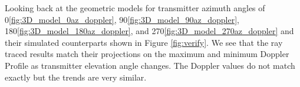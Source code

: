 Looking back at the geometric models for transmitter azimuth angles of 0\textdegree \space \ref{fig:3D_model_0az_doppler}, 90\textdegree \space \ref{fig:3D_model_90az_doppler}, 180\textdegree \space \ref{fig:3D_model_180az_doppler}, and 270\textdegree \space \ref{fig:3D_model_270az_doppler} and their simulated counterparts shown in Figure \ref{fig:verify}. We see that the ray traced results match their projections on the maximum and minimum Doppler Profile as transmitter elevation angle changes. The Doppler values do not match exactly but the trends are very similar.

\begin{figure}
\centering
	\newline
\end{figure}
